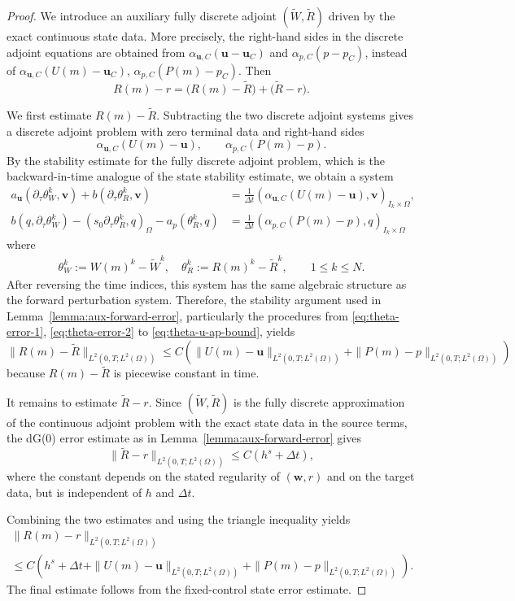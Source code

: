 \documentclass{amsart}
\newcommand{\LRp}[1]{\left( #1 \right)}
\begin{document}
\begin{proof}
We introduce an auxiliary fully discrete adjoint
$(\widetilde W,\widetilde R)$ driven by the exact continuous state data. More precisely, the right-hand sides in the discrete adjoint equations are obtained from $\alpha_{\boldsymbol{u},C}(\boldsymbol{u}-\boldsymbol{u}_C)$ and $\alpha_{p,C}(p-p_C)$, instead of
$\alpha_{\boldsymbol{u},C}(U(m)-\boldsymbol{u}_C)$, $\alpha_{p,C}(P(m)-p_C)$. 
Then
\[
R(m)-r
=
\bigl(R(m)-\widetilde R\bigr)
+
\bigl(\widetilde R-r\bigr).
\]

We first estimate $R(m)-\widetilde R$. Subtracting the two discrete
adjoint systems gives a discrete adjoint problem with zero terminal data
and right-hand sides
\[
\alpha_{\boldsymbol{u},C}(U(m)-\boldsymbol{u}),
\qquad
\alpha_{p,C}(P(m)-p).
\]
By the stability estimate for the fully discrete adjoint problem, which is
the backward-in-time analogue of the state stability estimate, we obtain a system
%
\begin{align}
\label{eq:WR-error-1}
a_{\boldsymbol u}(\partial_\tau\theta_{W}^k,\boldsymbol v)
+
b(\partial_\tau\theta_R^k,\boldsymbol v)
&=
\frac{1}{\Delta t} \LRp{\alpha_{\boldsymbol{u},C}(U(m)-\boldsymbol{u}), \boldsymbol v}_{I_k \times \Omega},
\\
\label{eq:WR-error-2}
b(q,\partial_\tau\theta_{W}^k)
-
(s_0\partial_\tau\theta_R^k,q)_\Omega
-
a_p(\theta_R^k,q)
&= \frac{1}{\Delta t}
\LRp{\alpha_{p,C}(P(m)-p), q}_{I_k \times \Omega}
\end{align}
%
where 
%
\begin{align*}
    \theta_W^k := W(m)^k - \widetilde{W}^k, \quad \theta_R^k := R(m)^k - \widetilde{R}^k , \qquad 1 \le k \le N . 
\end{align*}
%
After reversing the time indices, this system has the same algebraic structure as the forward perturbation system. Therefore, the stability
argument used in Lemma~\ref{lemma:aux-forward-error}, particularly the procedures from \eqref{eq:theta-error-1}, \eqref{eq:theta-error-2} to \eqref{eq:theta-u-ap-bound}, yields  
%
\[
\|R(m)-\widetilde R\|_{L^2(0,T;L^2(\Omega))}
\le
C\left(
\|U(m)-\boldsymbol{u}\|_{L^2(0,T;L^2(\Omega))}
+
\|P(m)-p\|_{L^2(0,T;L^2(\Omega))}
\right)
\]
%
because $R(m)-\widetilde{R}$ is piecewise constant in time. 

It remains to estimate $\widetilde R-r$. Since
$(\widetilde W,\widetilde R)$ is the fully discrete approximation of
the continuous adjoint problem with the exact state data in the source
terms, the dG(0) error estimate as in Lemma~\ref{lemma:aux-forward-error} gives
\[
\|\widetilde R-r\|_{L^2(0,T;L^2(\Omega))}
\le
C(h^s+\Delta t),
\]
where the constant depends on the stated regularity of
$(\boldsymbol{w},r)$ and on the target data, but is independent of
$h$ and $\Delta t$.

Combining the two estimates and using the triangle inequality yields
\begin{multline}
\|R(m)-r\|_{L^2(0,T;L^2(\Omega))} 
\\
\le
C\left(
h^s+\Delta t
+
\|U(m)-\boldsymbol{u}\|_{L^2(0,T;L^2(\Omega))}
+
\|P(m)-p\|_{L^2(0,T;L^2(\Omega))}
\right).
\end{multline}
The final estimate follows from the fixed-control state error estimate.
\end{proof}
\end{document}
